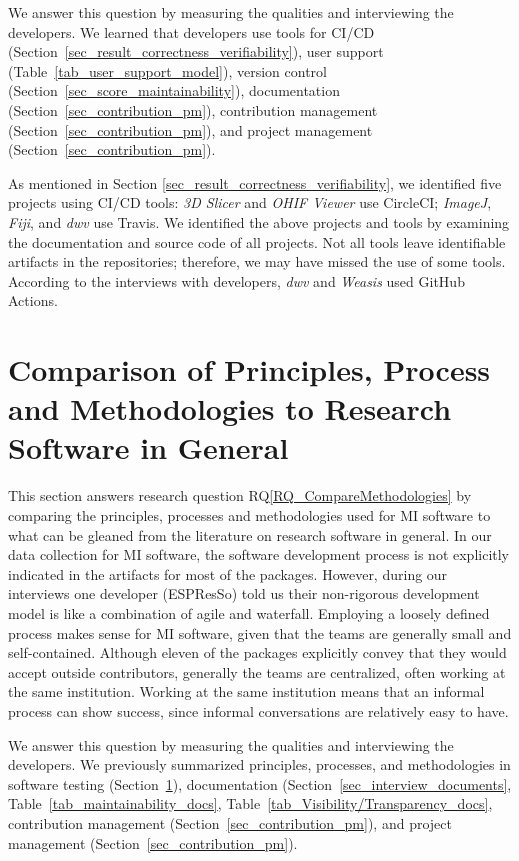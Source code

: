 \documentclass[final, 3p, times, authoryear]{elsarticle}
\newcommand{\rqref}[1]{RQ\ref{#1}}
\begin{document}
We answer this question by measuring the qualities and interviewing the
developers. We learned that developers use tools for CI/CD
(Section~\ref{sec_result_correctness_verifiability}), user support
(Table~\ref{tab_user_support_model}), version control
(Section~\ref{sec_score_maintainability}), documentation
(Section~\ref{sec_contribution_pm}), contribution management
(Section~\ref{sec_contribution_pm}), and project management
(Section~\ref{sec_contribution_pm}).
    
As mentioned in Section \ref{sec_result_correctness_verifiability}, we
identified five projects using CI/CD tools: \textit{3D Slicer} and \textit{OHIF
Viewer} use CircleCI; \textit{ImageJ}, \textit{Fiji}, and \textit{dwv} use
Travis. We identified the above projects and tools by examining the
documentation and source code of all projects. Not all tools leave identifiable
artifacts in the repositories; therefore, we may have missed the use of some
tools. According to the interviews with developers, \textit{dwv} and
\textit{Weasis} used GitHub Actions.

\section{Comparison of Principles, Process and Methodologies to Research Software in General} \label{Sec_CompareMethodologies}

This section answers research question \rqref{RQ_CompareMethodologies} by
comparing the principles, processes and methodologies used for MI software to
what can be gleaned from the literature on research software in general. In our
data collection for MI software, the software development process is not
explicitly indicated in the artifacts for most of the packages. However, during
our interviews one developer (ESPResSo) told us their non-rigorous development
model is like a combination of agile and waterfall. Employing a loosely defined
process makes sense for MI software, given that the teams are generally small
and self-contained.  Although eleven of the packages explicitly convey that they
would accept outside contributors, generally the teams are centralized, often
working at the same institution.  Working at the same institution means that an
informal process can show success, since informal conversations are relatively
easy to have.

We answer this question by measuring the qualities and interviewing the
developers. We previously summarized principles, processes, and methodologies in
software testing (Section~\ref{Sec_CompareMethodologies}), documentation
(Section~\ref{sec_interview_documents}, Table~\ref{tab_maintainability_docs},
Table~\ref{tab_Visibility/Transparency_docs}, contribution management
(Section~\ref{sec_contribution_pm}), and project management
(Section~\ref{sec_contribution_pm}). 
    
\end{document}
